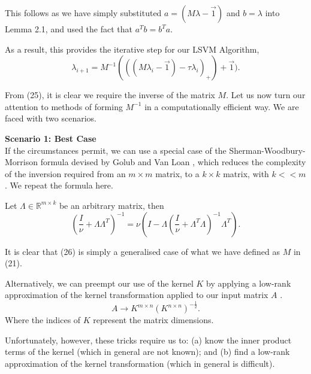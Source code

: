 \documentclass{article}
\begin{document}
This follows as we have simply substituted $a = (M \lambda - \Vec{1})$ and $b = \lambda$ into Lemma 2.1, and used the fact that $a^{T}b = b^{T}a$. \par

As a result, this provides the iterative step for our LSVM Algorithm,
\begin{equation}
    \lambda_{i+1} = M^{-1}(((M \lambda_{i} -\Vec{1}) -\tau \lambda_{i})_{+}) + \Vec{1}).
\end{equation} \par

From (25), it is clear we require the inverse of the matrix $M$. Let us now turn our attention to methods of forming $M^{-1}$ in a computationally efficient way. We are faced with two scenarios. \par

\textbf{Scenario 1: Best Case} \\
If the circumstances permit, we can use a special case of the  Sherman-Woodbury-Morrison formula devised by Golub and Van Loan \cite{golub2013matrix}, which reduces the complexity of the inversion required from an $m \times m$ matrix, to a $k \times k$ matrix, with $k << m$. 
We repeat the formula here. \par

Let $\Lambda \in \mathbb{R}^{m \times k}$ be an arbitrary matrix, then
\begin{equation}
    (\frac{I}{\nu} + \Lambda \Lambda^{T})^{-1} = \nu(I - \Lambda(\frac{I}{\nu} + \Lambda^{T} \Lambda)^{-1} \Lambda^{T}).
\end{equation} \par

It is clear that (26) is simply a generalised case of what we have defined as $M$ in (21). \par 

Alternatively, we can preempt our use of the kernel $K$ by applying a low-rank approximation of the kernel transformation applied to our input matrix $A$ \cite{scholkopf2002learning:ch10}.
\begin{equation}
    A \rightarrow K^{m \times n}(K^{n \times n})^{-\frac{1}{2}}.
\end{equation}
Where the indices of $K$ represent the matrix dimensions. \par

Unfortunately, however, these tricks require us to: (a) know the inner product terms of the kernel (which in general are not known); and (b) find a low-rank approximation of the kernel transformation (which in general is difficult). \par
\end{document}
